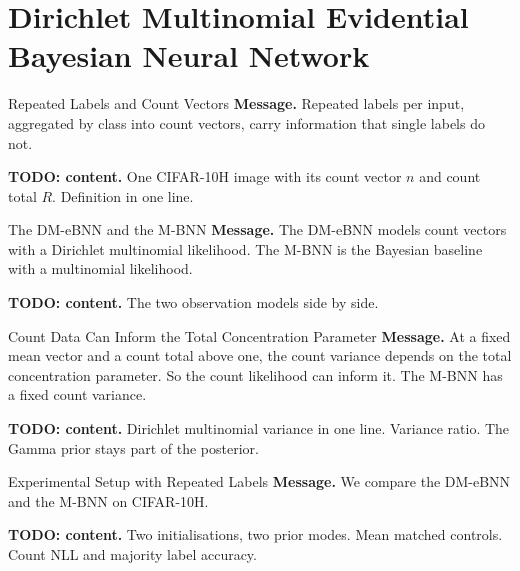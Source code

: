 
\section{Dirichlet Multinomial Evidential Bayesian Neural Network}

\begin{frame}{Repeated Labels and Count Vectors}
	\textbf{Message.} Repeated labels per input, aggregated by class into count vectors, carry information that single labels do not.

	\medskip
	\textbf{TODO: content.} One CIFAR-10H image with its count vector $n$ and count total $R$. Definition in one line.
\end{frame}

\begin{frame}{The DM-eBNN and the M-BNN}
	\textbf{Message.} The DM-eBNN models count vectors with a Dirichlet multinomial likelihood. The M-BNN is the Bayesian baseline with a multinomial likelihood.

	\medskip
	\textbf{TODO: content.} The two observation models side by side.
\end{frame}

\begin{frame}{Count Data Can Inform the Total Concentration Parameter}
	\textbf{Message.} At a fixed mean vector and a count total above one, the count variance depends on the total concentration parameter. So the count likelihood can inform it. The M-BNN has a fixed count variance.

	\medskip
	\textbf{TODO: content.} Dirichlet multinomial variance in one line. Variance ratio. The Gamma prior stays part of the posterior.
\end{frame}

\begin{frame}{Experimental Setup with Repeated Labels}
	\textbf{Message.} We compare the DM-eBNN and the M-BNN on CIFAR-10H.

	\medskip
	\textbf{TODO: content.} Two initialisations, two prior modes. Mean matched controls. Count NLL and majority label accuracy.
\end{frame}

